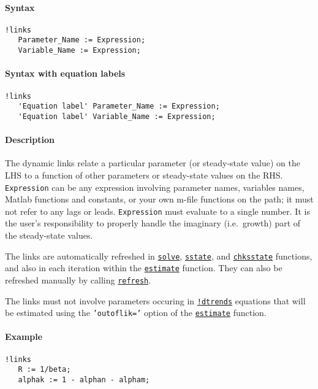 


	\paragraph{Syntax}\label{syntax}

\begin{verbatim}
!links
   Parameter_Name := Expression;
   Variable_Name := Expression;
\end{verbatim}

\paragraph{Syntax with equation
labels}\label{syntax-with-equation-labels}

\begin{verbatim}
!links
   'Equation label' Parameter_Name := Expression;
   'Equation label' Variable_Name := Expression;
\end{verbatim}

\paragraph{Description}\label{description}

The dynamic links relate a particular parameter (or steady-state value)
on the LHS to a function of other parameters or steady-state values on
the RHS. \texttt{Expression} can be any expression involving parameter
names, variables names, Matlab functions and constants, or your own
m-file functions on the path; it must not refer to any lags or leads.
\texttt{Expression} must evaluate to a single number. It is the user's
responsibility to properly handle the imaginary (i.e.~growth) part of
the steady-state values.

The links are automatically refreshed in
\href{model/solve}{\texttt{solve}},
\href{model/sstate}{\texttt{sstate}}, and
\href{model/chksstate}{\texttt{chksstate}} functions, and also in each
iteration within the \href{model/estimate}{\texttt{estimate}} function.
They can also be refreshed manually by calling
\href{model/refresh}{\texttt{refresh}}.

The links must not involve parameters occuring in
\href{modellang/dtrends}{\texttt{!dtrends}} equations that will be
estimated using the \texttt{'outoflik='} option of the
\href{model/estimate}{\texttt{estimate}} function.

\paragraph{Example}\label{example}

\begin{verbatim}
!links
   R := 1/beta;
   alphak := 1 - alphan - alpham;
\end{verbatim}


